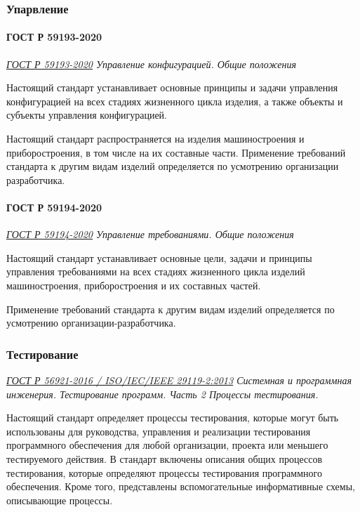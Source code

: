 \subsubsection{Упарвление}

\paragraph{ГОСТ Р 59193-2020}

\emph{\href{https://docs.cntd.ru/document/1200177489}{ГОСТ Р 59193-2020}
Управление конфигурацией. Общие положения
}

Настоящий стандарт устанавливает основные принципы
и задачи управления конфигурацией на всех стадиях жизненного цикла изделия,
а также объекты и субъекты управления конфигурацией.

Настоящий стандарт распространяется на изделия машиностроения
и приборостроения, в том числе на их составные части.
Применение требований стандарта к другим видам изделий определяется
по усмотрению организации разработчика.

\paragraph{ГОСТ Р 59194-2020}

\emph{\href{https://docs.cntd.ru/document/573219705}{ГОСТ Р 59194-2020}
Управление требованиями. Общие положения
}

Настоящий стандарт устанавливает основные цели,
задачи и принципы управления требованиями
на всех стадиях жизненного цикла изделий машиностроения,
приборостроения и их составных частей.

Применение требований стандарта к другим видам изделий определяется
по усмотрению организации-разработчика.

\subsubsection{Тестирование}

\emph{\href{https://docs.cntd.ru/document/1200134997}
{ГОСТ Р 56921-2016 / ISO/IEC/IEEE 29119-2:2013}
Системная и программная инженерия.
Тестирование программ.
Часть 2 Процессы тестирования.
}

Настоящий стандарт определяет процессы тестирования,
которые могут быть использованы для руководства,
управления и реализации тестирования программного обеспечения
для любой организации, проекта или меньшего тестируемого действия.
В стандарт включены описания общих процессов тестирования,
которые определяют процессы тестирования программного обеспечения.
Кроме того, представлены вспомогательные информативные схемы,
описывающие процессы.

